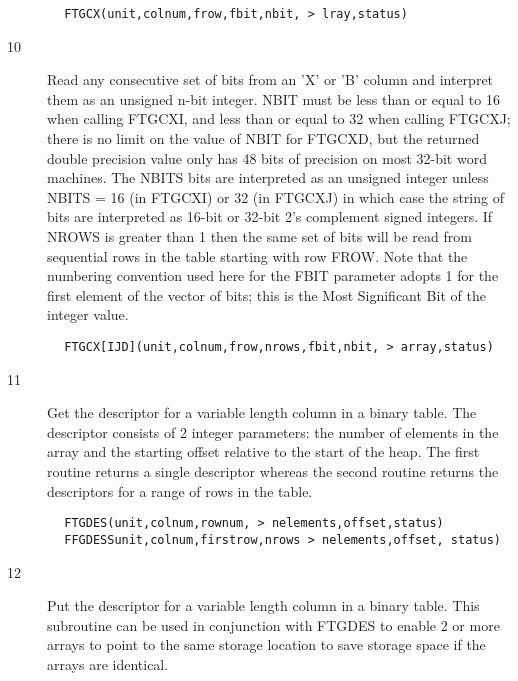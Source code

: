 \documentclass[11pt]{book}
\begin{document}
\begin{verbatim}
        FTGCX(unit,colnum,frow,fbit,nbit, > lray,status)
\end{verbatim}

\begin{description}
\item[10] Read any consecutive set of bits from an 'X' or 'B' column and
    interpret them as an unsigned n-bit integer. NBIT must be less than
    or equal to 16 when calling FTGCXI, and less than or equal to 32 when
    calling FTGCXJ; there is no limit on the value of NBIT for FTGCXD, but
    the returned double precision value only has 48 bits of precision on
    most 32-bit word machines.  The NBITS bits are interpreted as an
    unsigned integer unless NBITS = 16 (in FTGCXI) or 32 (in FTGCXJ) in which
    case the string of bits are interpreted as 16-bit or 32-bit 2's
    complement signed integers.  If NROWS is greater than 1 then the
    same set of bits will be read from sequential rows in the table
    starting with row FROW.  Note that the numbering convention
    used here for the FBIT parameter adopts 1 for the first element of the
   vector of bits;  this is the Most Significant Bit of the integer value.
\end{description}

\begin{verbatim}
        FTGCX[IJD](unit,colnum,frow,nrows,fbit,nbit, > array,status)
\end{verbatim}

\begin{description}
\item[11] Get the descriptor for a variable length column in a binary table.
    The descriptor consists of 2 integer parameters: the number of elements
    in the array and the starting offset relative to the start of the heap.
    The first routine returns a single descriptor whereas the second routine
   returns the descriptors for a range of rows in the table.
\end{description}

\begin{verbatim}
        FTGDES(unit,colnum,rownum, > nelements,offset,status)
        FFGDESSunit,colnum,firstrow,nrows > nelements,offset, status)
\end{verbatim}

\begin{description}
\item[12]  Put the descriptor for a variable length column in a binary table.
    This subroutine can be used in conjunction with FTGDES to enable
    2 or more arrays to point to the same storage location to save
   storage space if the arrays are identical.
\end{description}
\end{document}
